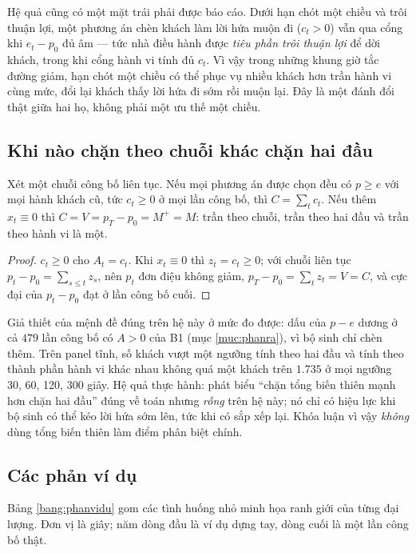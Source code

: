 Hệ quả cũng có một mặt trái phải được báo cáo. Dưới hạn chót một chiều và trôi thuận lợi, một
phương án chèn khách làm lời hứa muộn đi ($c_t > 0$) vẫn qua cổng khi $e_t - p_0$ đủ âm --- tức nhà
điều hành được \emph{tiêu phần trôi thuận lợi} để dời khách, trong khi cổng hành vi tính đủ $c_t$.
Vì vậy trong những khung giờ tắc đường giảm, hạn chót một chiều có thể phục vụ nhiều khách hơn trần
hành vi cùng mức, đổi lại khách thấy lời hứa đi sớm rồi muộn lại. Đây là một đánh đổi thật giữa hai
họ, không phải một ưu thế một chiều.

\subsection{Khi nào chặn theo chuỗi khác chặn hai đầu}
\label{muc:dondieu}

\begin{menhde}
\label{md:dondieu}
Xét một chuỗi công bố liên tục. Nếu mọi phương án được chọn đều có $p \ge e$ với mọi hành khách
cũ, tức $c_t \ge 0$ ở mọi lần công bố, thì $C = \sum_t c_t$. Nếu thêm $x_t \equiv 0$ thì
$C = V = p_T - p_0 = M^{+} = M$: trần theo chuỗi, trần theo hai đầu và trần theo hành vi là một.
\end{menhde}

\begin{proof}
$c_t \ge 0$ cho $A_t = c_t$. Khi $x_t \equiv 0$ thì $z_t = c_t \ge 0$; với chuỗi liên tục
$p_t - p_0 = \sum_{s \le t} z_s$, nên $p_t$ đơn điệu không giảm, $p_T - p_0 = \sum_t z_t = V = C$,
và cực đại của $p_t - p_0$ đạt ở lần công bố cuối.
\end{proof}

Giả thiết của mệnh đề đúng trên hệ này ở mức đo được: dấu của $p - e$ dương ở cả $479$ lần công bố
có $A > 0$ của B1 (mục \ref{muc:phanra}), vì bộ sinh chỉ chèn thêm. Trên panel tĩnh, số khách vượt
một ngưỡng tính theo hai đầu và tính theo thành phần hành vi khác nhau không quá một khách trên
$1.735$ ở mọi ngưỡng 30, 60, 120, 300 giây. Hệ quả thực hành: phát biểu ``chặn tổng biến thiên mạnh
hơn chặn hai đầu'' đúng về toán nhưng \emph{rỗng} trên hệ này; nó chỉ có hiệu lực khi bộ sinh có thể
kéo lời hứa sớm lên, tức khi có sắp xếp lại. Khóa luận vì vậy \emph{không} dùng tổng biến thiên làm
điểm phân biệt chính.

\subsection{Các phản ví dụ}

Bảng \ref{bang:phanvidu} gom các tình huống nhỏ minh họa ranh giới của từng đại lượng. Đơn vị là
giây; năm dòng đầu là ví dụ dựng tay, dòng cuối là một lần công bố thật.

